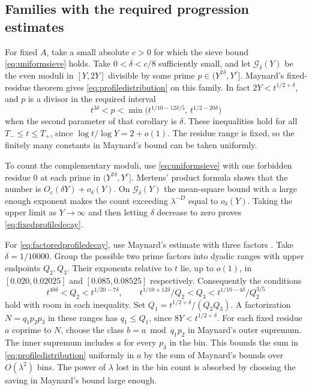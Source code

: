 \documentclass[11pt,a4paper]{article}
\numberwithin{equation}{section}
\begin{document}
\subsection{Families with the required progression estimates}

For fixed $A$, take a small absolute $c>0$ for which the
sieve bound \cref{eq:uniformsieve} holds. Take
$0<\delta<c/8$ sufficiently small, and let $\mathcal G_\delta(Y)$
be the even moduli in $[Y,2Y]$ divisible by some prime
$p\in(Y^{7\delta},Y^c]$. Maynard's fixed-residue theorem
\cite[Corollary~1.2]{MaynardI} gives \cref{eq:profiledistribution}
on this family. In fact $2Y<t^{1/2+\delta}$, and $p$ is a
divisor in the required interval
\[
 t^{3\delta}<p<
       \min\bigl(t^{1/10-12\delta/5},\,t^{1/2-20\delta}\bigr)
\]
when the second parameter of that corollary is $\delta$.
These inequalities hold for all $T_-\le t\le T_+$, since
$\log t/\log Y=2+o(1)$. The residue range is fixed, so
the finitely many constants in Maynard's bound can be
taken uniformly.

To count the complementary moduli, use
\cref{eq:uniformsieve} with one forbidden residue $0$
at each prime in $(Y^{7\delta},Y^c]$. Mertens' product
formula shows that the number is $O_c(\delta Y)+o_\delta(Y)$.
On $\mathcal G_\delta(Y)$ the mean-square bound with a
large enough exponent makes the count exceeding
$\lambda^{-D}$ equal to $o_\delta(Y)$. Taking the upper
limit as $Y\to\infty$ and then letting $\delta$ decrease to
zero proves \cref{eq:fixedprofiledecay}.

For \cref{eq:factoredprofiledecay}, use Maynard's estimate
with three factors \cite[Theorem~1.2]{MaynardIII}. Take
$\delta=1/10000$. Group the possible two prime factors into
dyadic ranges with upper endpoints $Q_2,Q_3$. Their exponents
relative to $t$ lie, up to $o(1)$, in
$[0.020,0.02025]$ and $[0.085,0.08525]$ respectively.
Consequently the conditions
\[
 t^{40\delta}<Q_2<t^{1/20-7\delta},\qquad
 t^{1/10+12\delta}/Q_2<Q_3<t^{1/10-4\delta}/Q_2^{3/5}
\]
hold with room in each inequality. Set
$Q_1=t^{1/2+\delta}/(Q_2Q_3)$. A factorization
$N=q_1p_2p_3$ in these ranges has $q_1\le Q_1$, since
$8Y<t^{1/2+\delta}$. For each fixed residue $a$ coprime
to $N$, choose the class $b=a\bmod q_1p_2$ in Maynard's
outer supremum. The inner supremum includes $a$ for
every $p_3$ in the bin. This bounds the sum in
\cref{eq:profiledistribution} uniformly in $a$ by the sum
of Maynard's bounds over $O(\lambda^2)$ bins. The power of
$\lambda$ lost in the bin count is absorbed by choosing
the saving in Maynard's bound large enough.
\end{document}
